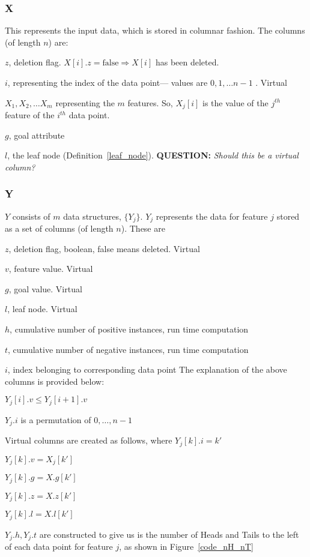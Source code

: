 \documentclass[12pt,letterpaper]{article}
\begin{document}
\subsubsection{X}
This represents the input data, which is 
stored in columnar fashion. The columns (of length \(n\)) are:
  \be
\item \(z\), deletion flag. \(X[i].z = \mathrm{false} \Rightarrow X[i]\) has been
  deleted. 
\item \(i\), representing the index of the data point--- values are \(0, 1,
  \ldots n-1\) . Virtual
\item \(X_1, X_2, \ldots X_m\) representing the \(m\) features.
  So, \(X_j[i]\) is the value of the \(j^{th}\) feature of the \(i^{th}\) data
  point.
\item \(g\), goal attribute
\item \(l\), the leaf node (Definition~\ref{leaf_node}). 
  {\bf QUESTION:} {\em Should this be a virtual column?}
\ee

\subsubsection{Y}
\(Y\) consists of \(m\) data structures, \(\{Y_j\}\). \(Y_j\)
represents the data for feature \(j\) stored as a set of columns 
(of length \(n\)). These are 
\be
\item \(z\), deletion flag, boolean, false means deleted. Virtual
\item \(v\), feature value. Virtual
\item \(g\), goal value. Virtual
\item \(l\), leaf node. Virtual
\item \(h\), cumulative number of positive instances, run time computation
\item \(t\), cumulative number of negative instances, run time computation
\item \(i\), index belonging to corresponding data point
\ee
The explanation of the above columns is provided below:
\be
\item \(Y_j[i].v \leq Y_j[i+1].v\)
\item \(Y_j.i\) is a permutation of \(0, \ldots, n-1\)
\item Virtual columns are created as follows, where \(Y_j[k].i = k'\)
  \be
\item \(Y_j[k].v = X_j[k']\) 
\item \(Y_j[k].g = X.g[k']\) 
\item \(Y_j[k].z = X.z[k']\) 
\item \(Y_j[k].l = X.l[k']\) 
\item \(Y_j.h, Y_j.t\) are constructed to give us is the number of 
Heads and Tails to the left of each data point for feature \(j\), as shown in
Figure~\ref{code_nH_nT}
\ee
\ee
\end{document}
